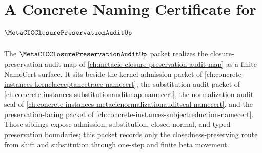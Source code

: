 \chapter{A Concrete Naming Certificate for $\MetaCICClosurePreservationAuditUp$}
\label{ch:concrete-instances-metacicclosurepreservationaudit-namecert}

The $\MetaCICClosurePreservationAuditUp$ packet realizes the closure-preservation audit map of \autoref{ch:metacic-closure-preservation-audit-map} as a finite NameCert surface. It sits beside the kernel admission packet of \autoref{ch:concrete-instances-kernelacceptancetrace-namecert}, the substitution audit packet of \autoref{ch:concrete-instances-substitutionauditmap-namecert}, the normalization audit seal of \autoref{ch:concrete-instances-metacicnormalizationauditseal-namecert}, and the preservation-facing packet of \autoref{ch:concrete-instances-subjectreduction-namecert}. Those siblings expose admission, substitution, closed-normal, and typed-preservation boundaries; this packet records only the closedness-preserving route from shift and substitution through one-step and finite beta movement.

